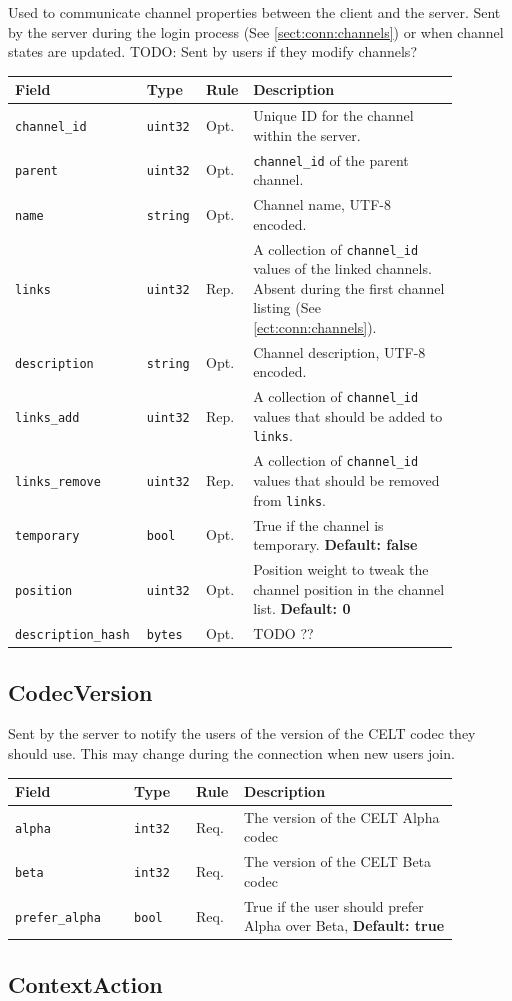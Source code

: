 \documentclass[11pt]{article} %
\newenvironment{mumbleMessageEx}
{%
	\small
	\renewcommand\arraystretch{1.5}
	\begin{tabular}{p{0.25\linewidth}p{0.13\linewidth}p{0.05\linewidth}p{0.45\linewidth}}
	Field & Type & Rule & Description \\
	\hline
}
{%
	\end{tabular}
	\renewcommand\arraystretch{1.0}
}
\newcommand{\mumbleMessageExItem}[4]{ \texttt{#1} & \texttt{#2} & #3 & #4 \\ }
\begin{document}
Used to communicate channel properties between the client and the server. Sent by the server during the login process (See \ref{sect:conn:channels}) or when channel states are updated. TODO: Sent by users if they modify channels?

\begin{mumbleMessageEx}
\mumbleMessageExItem{channel\_id}{uint32}{Opt.}{Unique ID for the channel within the server.}
\mumbleMessageExItem{parent}{uint32}{Opt.}{\texttt{channel\_id} of the parent channel.}
\mumbleMessageExItem{name}{string}{Opt.}{Channel name, UTF-8 encoded.}
\mumbleMessageExItem{links}{uint32}{Rep.}{A collection of \texttt{channel\_id} values of the linked channels. Absent during the first channel listing (See \ref{ect:conn:channels}).}
\mumbleMessageExItem{description}{string}{Opt.}{Channel description, UTF-8 encoded.}
\mumbleMessageExItem{links\_add}{uint32}{Rep.}{A collection of \texttt{channel\_id} values that should be added to \texttt{links}.}
\mumbleMessageExItem{links\_remove}{uint32}{Rep.}{A collection of \texttt{channel\_id} values that should be removed from \texttt{links}.}
\mumbleMessageExItem{temporary}{bool}{Opt.}{True if the channel is temporary. \textbf{Default: false}}
\mumbleMessageExItem{position}{uint32}{Opt.}{Position weight to tweak the channel position in the channel list. \textbf{Default: 0}}
\mumbleMessageExItem{description\_hash}{bytes}{Opt.}{TODO ??}
\end{mumbleMessageEx}

\subsection{CodecVersion}
\label{msg:codecVersion}

Sent by the server to notify the users of the version of the CELT codec they should use. This may change during the connection when new users join.

\begin{mumbleMessageEx}
\mumbleMessageExItem{alpha}{int32}{Req.}{The version of the CELT Alpha codec}
\mumbleMessageExItem{beta}{int32}{Req.}{The version of the CELT Beta codec}
\mumbleMessageExItem{prefer\_alpha}{bool}{Req.}{True if the user should prefer Alpha over Beta, \textbf{Default: true}}
\end{mumbleMessageEx}

\subsection{ContextAction}
\label{msg:contextAction}
\end{document}
